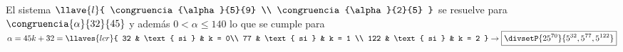 El sistema
$\llave{l}{
		\congruencia{\alpha}{5}{9} \\
		\congruencia{\alpha}{2}{5}
	}$
se resuelve para $\congruencia{\alpha}{32}{45}$ y además $0<\alpha \leq 140$ lo que se
cumple para $\alpha = 45k + 32 =
	\llaves{lcr}{
		32  &  \text{ si } & k = 0\\
		77  &  \text{ si } & k = 1 \\
		122 &  \text{ si } & k = 2
	} \to \boxed{\divsetP{25^{70}}{ 5^{32}, 5^{77}, 5^{122} }}  $
